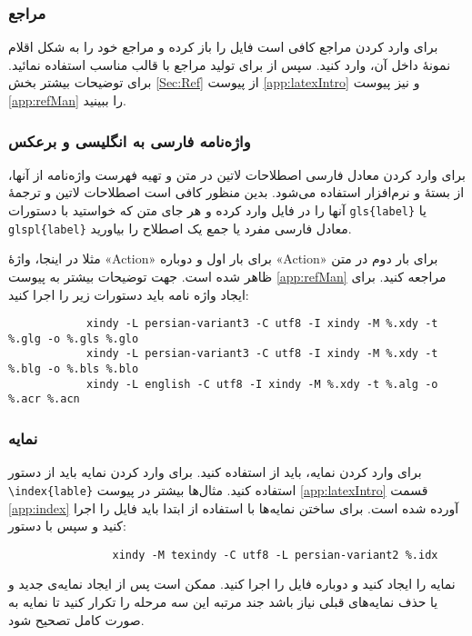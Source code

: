 	\subsubsection{مراجع}
	برای وارد کردن مراجع \پ کافی است فایل 
	را باز کرده و مراجع خود را به شکل اقلام نمونهٔ داخل آن، وارد کنید.  سپس از  برای تولید مراجع با قالب مناسب استفاده نمائید. برای توضیحات بیشتر بخش \ref{Sec:Ref} از پیوست \ref{app:latexIntro} و نیز پیوست \ref{app:refMan} را ببینید.
	
	\subsubsection{واژه‌نامه فارسی به انگلیسی و برعکس}
	برای وارد کردن معادل فارسی اصطلاحات لاتین در متن و تهیه فهرست واژه‌نامه از آنها، از بستهٔ
	و نرم‌افزار
	استفاده می‌شود. بدین منظور کافی است اصطلاحات لاتین و ترجمهٔ آنها را در فایل
	وارد کرده و هر جای متن که خواستید با دستورات
	\verb|gls{label}|
	یا \verb|glspl{label}|
	معادل فارسی مفرد یا جمع یک اصطلاح را بیاورید.
	
	مثلا در اینجا، واژهٔ
	«\gls{Action}»
	برای بار اول و دوباره
	«\gls{Action}»
	برای بار دوم در متن ظاهر شده است.
	جهت توضیحات بیشتر به پیوست
	\ref{app:refMan}
	مراجعه کنید.
	برای ایجاد واژه نامه باید دستورات زیر را اجرا کنید:\\
	{\small
	\begin{LTR}
		\begin{verbatim}
			xindy -L persian-variant3 -C utf8 -I xindy -M %.xdy -t %.glg -o %.gls %.glo
			xindy -L persian-variant3 -C utf8 -I xindy -M %.xdy -t %.blg -o %.bls %.blo
			xindy -L english -C utf8 -I xindy -M %.xdy -t %.alg -o %.acr %.acn
		\end{verbatim}
	\end{LTR}}

	
	\subsubsection{نمایه}
	برای وارد کردن نمایه، باید از 
	استفاده کنید. 
	برای وارد کردن نمایه باید از دستور
	\verb*|\index{lable}|
	استفاده کنید. مثال‌ها بیشتر در پیوست
	\ref{app:latexIntro}
	قسمت 
	\ref{app:index}
	آورده شده است. برای ساختن نمایه‌ها با استفاده از 
	ابتدا باید فایل 
	را اجرا کنید و سپس با دستور:
	{\small
		\begin{LTR}
			\begin{verbatim}
				xindy -M texindy -C utf8 -L persian-variant2 %.idx
			\end{verbatim}
	\end{LTR}}
    نمایه را ایجاد کنید و دوباره  فایل 
	را اجرا کنید. ممکن است پس از ایجاد نمایه‌ی جدید و یا حذف نمایه‌های قبلی نیاز باشد 
	جند مرتبه این سه مرحله را تکرار کنید تا نمایه به صورت کامل تصحیح شود.


